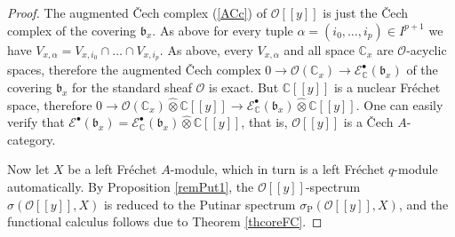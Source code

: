\documentclass[12pt]{amsart}%
\theoremstyle{plain}
\numberwithin{equation}{section}
\numberwithin{equation}{section}
\numberwithin{theorem}{section}
\numberwithin{lemma}{section}
\numberwithin{remark}{section}
\numberwithin{example}{section}
\numberwithin{proposition}{section}
\numberwithin{definition}{section}
\numberwithin{corollary}{section}
\begin{document}
\begin{proof}
The augmented \v{C}ech complex (\ref{ACc}) of $\mathcal{O}\left[  \left[
y\right]  \right]  $ is just the \v{C}ech complex of the covering
$\mathfrak{b}_{x}$. As above for every tuple $\alpha=\left(  i_{0}%
,\ldots,i_{p}\right)  \in I^{p+1}$ we have $V_{x,\alpha}=V_{x,i_{0}}\cap
\ldots\cap V_{x,i_{p}}$. As above, every $V_{x,\alpha}$ and all space
$\mathbb{C}_{x}$ are $\mathcal{O}$-acyclic spaces, therefore the augmented
\v{C}ech complex $0\rightarrow\mathcal{O}\left(  \mathbb{C}_{x}\right)
\longrightarrow\mathcal{E}_{\mathbb{C}}^{\bullet}\left(  \mathfrak{b}%
_{x}\right)  $ of the covering $\mathfrak{b}_{x}$ for the standard sheaf
$\mathcal{O}$ is exact. But $\mathbb{C}\left[  \left[  y\right]  \right]  $ is
a nuclear Fr\'{e}chet space, therefore $0\rightarrow\mathcal{O}\left(
\mathbb{C}_{x}\right)  \widehat{\otimes}\mathbb{C}\left[  \left[  y\right]
\right]  \longrightarrow\mathcal{E}_{\mathbb{C}}^{\bullet}\left(
\mathfrak{b}_{x}\right)  \widehat{\otimes}\mathbb{C}\left[  \left[  y\right]
\right]  $. One can easily verify that $\mathcal{E}^{\bullet}\left(
\mathfrak{b}_{x}\right)  =\mathcal{E}_{\mathbb{C}}^{\bullet}\left(
\mathfrak{b}_{x}\right)  \widehat{\otimes}\mathbb{C}\left[  \left[  y\right]
\right]  $, that is, $\mathcal{O}\left[  \left[  y\right]  \right]  $ is a
\v{C}ech $A$-category.

Now let $X$ be a left Fr\'{e}chet $A$-module, which in turn is a left
Fr\'{e}chet $q$-module automatically. By Proposition \ref{remPut1}, the
$\mathcal{O}\left[  \left[  y\right]  \right]  $-spectrum $\sigma\left(
\mathcal{O}\left[  \left[  y\right]  \right]  ,X\right)  $ is reduced to the
Putinar spectrum $\sigma_{\operatorname{P}}\left(  \mathcal{O}\left[  \left[
y\right]  \right]  ,X\right)  $, and the functional calculus follows due to
Theorem \ref{thcoreFC}.


\end{proof}
\end{document}
